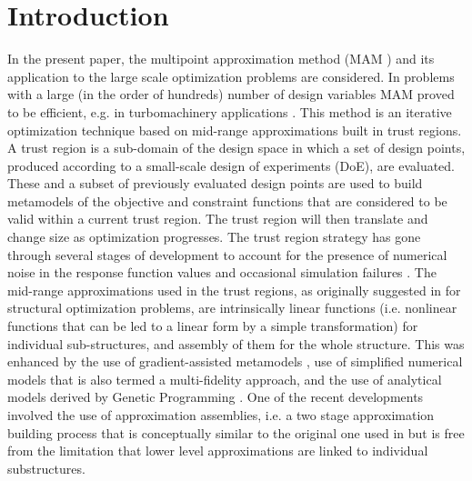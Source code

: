 \documentclass[runningheads,a4paper]{llncs}
\begin{document}
\section{Introduction}

In the present paper, the multipoint approximation method (MAM \cite{Toropov1989,Toropov1992,ToropovFilatov1993}) and its application to the large scale optimization problems are considered. In problems with a large (in the order of hundreds) number of design variables MAM proved to be efficient, e.g. in turbomachinery applications \cite{ShahparPolynkinToropov2008,PolynkinToropovShahpar2008,PolynkinToropovShahpar2010}. This method is an iterative optimization technique based on mid-range approximations built in trust regions. A trust region is a sub-domain of the design space in which a set of design points, produced according to a small-scale design of experiments (DoE), are evaluated. These and a subset of previously evaluated design points are used to build metamodels of the objective and constraint functions that are considered to be valid within a current trust region. The trust region will then translate and change size as optimization progresses. The trust region strategy has gone through several stages of development to account for the presence of numerical noise in the response function values \cite{KeulenToropovMarkine1996,ToropovKeulenMarkine1996} and occasional simulation failures \cite{ToropovMarkineHolden1999}. The mid-range approximations used in the trust regions, as originally suggested in \cite{Toropov1989} for structural optimization problems, are intrinsically linear functions (i.e. nonlinear functions that can be led to a linear form by a simple transformation) for individual sub-structures, and assembly of them for the whole structure. This was enhanced by the use of gradient-assisted metamodels \cite{ToropovFilatov1993}, use of simplified numerical models that is also termed a multi-fidelity approach,\cite{ToropovMarkine1996} and the use of analytical models derived by Genetic Programming \cite{ToropovAlvarez1998}. One of the recent developments \cite{PolynkinToropov2012} involved the use of approximation assemblies, i.e. a two stage approximation building process that is conceptually similar to the original one used in \cite{Toropov1989} but is free from the limitation that lower level approximations are linked to individual substructures.
\end{document}
